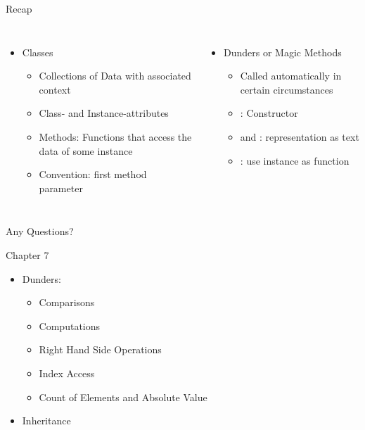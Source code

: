 
\begin{frame}[t,plain]
\titlepage
\end{frame}


\begin{frame}[fragile]{Recap}
%
\begin{columns}[T]
\begin{itemize}
\item Classes
	\begin{itemize}
	\item Collections of Data with associated context
	\item Class- and Instance-attributes
	\item Methods: Functions that access the data of some instance
	\item Convention: first method parameter 
	\end{itemize}
\end{itemize}
%
\begin{itemize}
\item Dunders or Magic Methods
	\begin{itemize}
	\item Called automatically in certain circumstances
	\item {}: Constructor
	\item {} and : representation as text
	\item {}: use instance as function
	\end{itemize}
\end{itemize}
\end{columns}
%
\begin{center}
Any Questions?
\end{center}
%
\end{frame}


\begin{frame}[fragile]{Chapter 7}
%
\begin{itemize}
\item Dunders: 
	\begin{itemize}
	\item Comparisons
	\item Computations
	\item Right Hand Side Operations
	\item Index Access
	\item Count of Elements and Absolute Value
	\end{itemize}
\item Inheritance
\end{itemize}
%
\end{frame}

